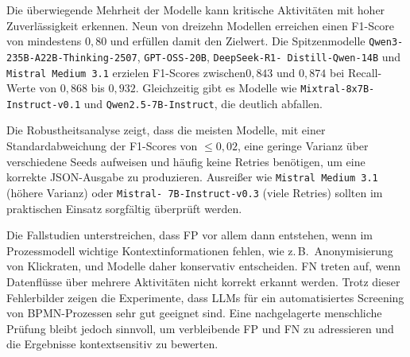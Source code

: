 Die überwiegende Mehrheit der Modelle kann kritische Aktivitäten mit hoher Zuverlässigkeit erkennen. Neun von dreizehn Modellen erreichen einen F1-Score von mindestens $0{,}80$ und erfüllen damit den Zielwert. Die Spitzenmodelle \texttt{Qwen3-235B-A22B-Thinking-2507}, \texttt{GPT-OSS-20B}, \texttt{DeepSeek-R1-\linebreak~Distill-Qwen-14B} und \texttt{Mistral Medium 3.1} erzielen F1-Scores zwischen\linebreak$0{,}843$ und $0{,}874$ bei Recall-Werte von $0{,}868$ bis $0{,}932$. Gleichzeitig gibt es Modelle wie \texttt{Mixtral-8x7B-Instruct-v0.1} und \texttt{Qwen2.5-7B-Instruct}, die deutlich abfallen.

Die Robustheitsanalyse zeigt, dass die meisten Modelle, mit einer Standardabweichung der F1-Scores von $\leq 0{,}02$, eine geringe Varianz über verschiedene Seeds aufweisen und häufig keine Retries benötigen, um eine korrekte JSON-Ausgabe zu produzieren. Ausreißer wie \texttt{Mistral Medium 3.1} (höhere Varianz) oder \texttt{Mistral-\linebreak~7B-Instruct-v0.3} (viele Retries) sollten im praktischen Einsatz sorgfältig überprüft werden.

Die Fallstudien unterstreichen, dass \ac{FP} vor allem dann entstehen, wenn im Prozessmodell wichtige Kontextinformationen fehlen, wie z.\,B.\ Anonymisierung von Klickraten, und Modelle daher konservativ entscheiden. \ac{FN} treten auf, wenn Datenflüsse über mehrere Aktivitäten nicht korrekt erkannt werden. Trotz dieser Fehlerbilder zeigen die Experimente, dass \acp{LLM} für ein automatisiertes Screening von \ac{BPMN}-Prozessen sehr gut geeignet sind. Eine nachgelagerte menschliche Prüfung bleibt jedoch sinnvoll, um verbleibende \ac{FP} und \ac{FN} zu adressieren und die Ergebnisse kontextsensitiv zu bewerten.